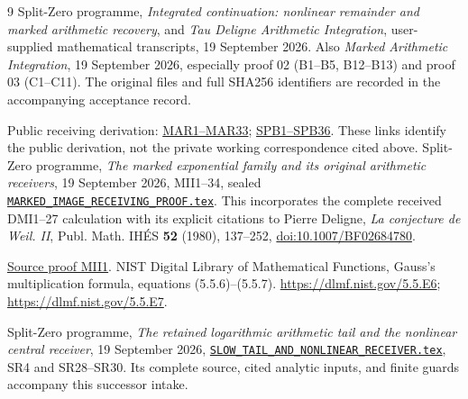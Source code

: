 \documentclass[11pt]{article}
\begin{document}
\begin{thebibliography}{9}
Split-Zero programme, \emph{Integrated continuation: nonlinear
remainder and marked arithmetic recovery}, and \emph{Tau Deligne
Arithmetic Integration}, user-supplied mathematical transcripts,
19 September 2026. Also \emph{Marked Arithmetic Integration},
19 September 2026, especially proof 02 (B1--B5, B12--B13) and
proof 03 (C1--C11). The original files and full SHA256 identifiers
are recorded in the accompanying acceptance record.


Public receiving derivation: \href{https://github.com/KokunoYumeto/zeta-function-research-reader/blob/689a8f87e9c12b7a99b01b3123438c6751ee608f/workbenches/splitzero-tandem/continuations/20260920-native-heat-action/providers/MARKED_ARITHMETIC_RECOVERY.tex\#L39}{MAR1--MAR33}; \href{https://github.com/KokunoYumeto/zeta-function-research-reader/blob/689a8f87e9c12b7a99b01b3123438c6751ee608f/workbenches/splitzero-tandem/continuations/20260920-native-heat-action/providers/MARKED_ARITHMETIC_RECOVERY.tex\#L646}{SPB1--SPB36}. These links identify the public derivation, not the private working correspondence cited above.
Split-Zero programme, \emph{The marked exponential family and its
original arithmetic receivers}, 19 September 2026, MII1--34,
sealed \href{https://github.com/KokunoYumeto/zeta-function-research-reader/blob/487253b5b01851da5b9b98af4e146fecf1fab902/workbenches/splitzero-tandem/continuations/20260919-arithmetic-signs-marked-classes/first_intake/marked_image/MARKED_IMAGE_RECEIVING_PROOF.tex\#L1}{\texttt{MARKED\_IMAGE\_RECEIVING\_PROOF.tex}}.
This incorporates the complete received DMI1--27 calculation
with its explicit citations to Pierre Deligne, \emph{La conjecture
de Weil. II}, Publ. Math. IH\'ES \textbf{52} (1980), 137--252,
\href{https://doi.org/10.1007/BF02684780}{doi:10.1007/BF02684780}.


\href{https://github.com/KokunoYumeto/zeta-function-research-reader/blob/487253b5b01851da5b9b98af4e146fecf1fab902/workbenches/splitzero-tandem/continuations/20260919-arithmetic-signs-marked-classes/first_intake/marked_image/MARKED_IMAGE_RECEIVING_PROOF.tex\#L44}{Source proof MII1}.
NIST Digital Library of Mathematical Functions,
Gauss's multiplication formula, equations (5.5.6)--(5.5.7).
\url{https://dlmf.nist.gov/5.5.E6};
\url{https://dlmf.nist.gov/5.5.E7}.

Split-Zero programme, \emph{The retained logarithmic arithmetic tail
and the nonlinear central receiver}, 19 September 2026,
\href{https://github.com/KokunoYumeto/zeta-function-research-reader/blob/487253b5b01851da5b9b98af4e146fecf1fab902/workbenches/splitzero-tandem/continuations/20260919-arithmetic-signs-marked-classes/arrival_02/signed_refinement/SLOW_TAIL_AND_NONLINEAR_RECEIVER.tex\#L1}{\texttt{SLOW\_TAIL\_AND\_NONLINEAR\_RECEIVER.tex}},
SR4 and SR28--SR30. Its complete source, cited analytic inputs,
and finite guards accompany this successor intake.



\end{thebibliography}
\end{document}
